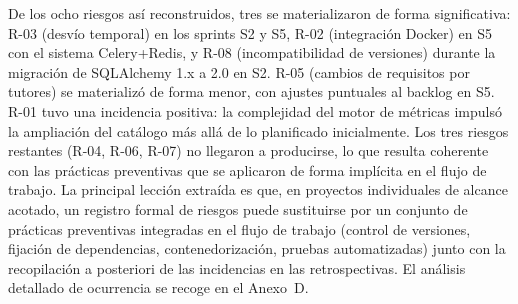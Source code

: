 De los ocho riesgos así reconstruidos, tres se materializaron de forma
significativa: R-03 (desvío temporal) en los sprints S2 y S5, R-02
(integración Docker) en S5 con el sistema Celery+Redis, y R-08
(incompatibilidad de versiones) durante la migración de SQLAlchemy
1.x a 2.0 en S2.  R-05 (cambios de requisitos por tutores) se
materializó de forma menor, con ajustes puntuales al backlog en S5.
R-01 tuvo una incidencia positiva: la complejidad del motor de
métricas impulsó la ampliación del catálogo más allá de lo planificado
inicialmente.  Los tres riesgos restantes (R-04, R-06, R-07) no
llegaron a producirse, lo que resulta coherente con las prácticas
preventivas que se aplicaron de forma implícita en el flujo de
trabajo.  La principal lección extraída es que, en proyectos
individuales de alcance acotado, un registro formal de riesgos puede
sustituirse por un conjunto de prácticas preventivas integradas en el
flujo de trabajo (control de versiones, fijación de dependencias,
contenedorización, pruebas automatizadas) junto con la recopilación
a posteriori de las incidencias en las retrospectivas.  El análisis detallado de
ocurrencia se recoge en el Anexo~D.


